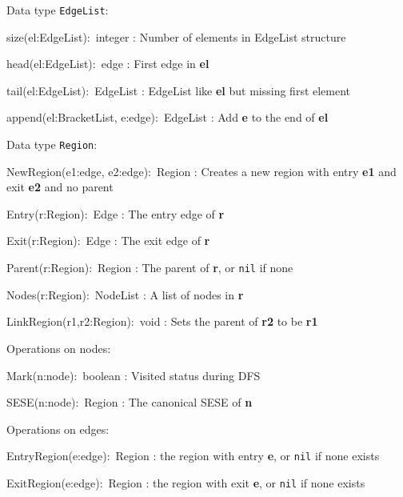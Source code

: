 Data type \texttt{EdgeList}:
\begin{tightdesc}
\item[size(el:EdgeList):~integer]
:	Number of elements in EdgeList structure
\item[head(el:EdgeList):~edge]
:	First edge in \textbf{el}
\item[tail(el:EdgeList):~EdgeList]
:	EdgeList like \textbf{el} but missing first element
\item[append(el:BracketList, e:edge):~EdgeList]
:	Add \textbf{e} to the end of \textbf{el}
\end{tightdesc}

Data type \texttt{Region}:
\begin{tightdesc}
\item[NewRegion(e1:edge, e2:edge):~Region]
:	Creates a new region with entry \textbf{e1} and exit \textbf{e2}
        and no parent
\item[Entry(r:Region):~Edge]
:	The entry edge of \textbf{r}
\item[Exit(r:Region):~Edge]
:	The exit edge of \textbf{r}
\item[Parent(r:Region):~Region]
:	The parent of \textbf{r}, or \texttt{nil} if none
\item[Nodes(r:Region):~NodeList]
:	A list of nodes in \textbf{r}
\item[LinkRegion(r1,r2:Region):~void]
:	Sets the parent of \textbf{r2} to be \textbf{r1}
\end{tightdesc}

Operations on nodes:
\begin{tightdesc}
\item[Mark(n:node):~boolean]
:	Visited status during DFS
\item[SESE(n:node):~Region]
:	The canonical SESE of \textbf{n}
\end{tightdesc}

Operations on edges:
\begin{tightdesc}
\item[EntryRegion(e:edge):~Region]
:	the region with entry \textbf{e}, or \texttt{nil} if none exists
\item[ExitRegion(e:edge):~Region]
:	the region with exit \textbf{e}, or \texttt{nil} if none exists
\end{tightdesc}

